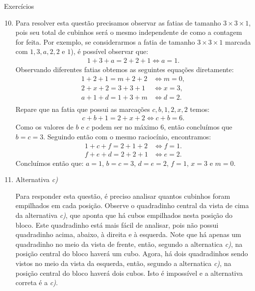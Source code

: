 \begin{answer}{Exercícios}
{\exerciselist
\begin{enumerate}\setcounter{enumi}{9}
\item Para resolver esta questão precisamos observar as fatias de tamanho \(3 \times 3 \times 1\), pois seu total de cubinhos será o mesmo independente de como a contagem for feita. Por exemplo, se considerarmos a fatia de tamanho \(3 \times 3 \times 1\) marcada com \(1, 3, a, 2, 2\) e \(1\)), é possível observar que:
\begin{equation*}
\begin{split}1+3+a=2+2+1 \Longleftrightarrow a = 1.\end{split}
\end{equation*}
Observando diferentes fatias obtemos as seguintes equações diretamente:
\begin{align*}
1+2+1=m+2+2 &\Longleftrightarrow m=0,\\
2+x+2=3+3+1 &\Longleftrightarrow x=3,\\
a+1+d=1+3+m &\Longleftrightarrow d=2.\\
\end{align*}
Repare que na fatia que possui as marcações \(c, b, 1, 2, x, 2\) temos:
\begin{equation*}
\begin{split}c+b+1=2+x+2 \Longleftrightarrow c+b=6.\end{split}
\end{equation*}
Como os valores de \(b\) e \(c\) podem ser no máximo 6, então concluímos que \(b=c=3\). Seguindo então com o mesmo raciocínio, encontramos:
\begin{align*}
1+c+f=2+1+2 &\Longleftrightarrow f = 1.\\
f+e+d=2+2+1 &\Longleftrightarrow e=2.
\end{align*}
Concluímos então que: \(a=1\), \(b=c=3\), \(d=e=2\), \(f=1\), \(x=3\) e \(m=0\).

\item Alternativa \textit{c)}

Para responder esta questão, é preciso analisar quantos cubinhos foram empilhados em cada posição. Observe o quadradinho central da vista de cima da alternativa \textit{c)}, que aponta que há cubos empilhados nesta posição do bloco. Este quadradinho está mais fácil de analisar, pois não possui quadradinho acima, abaixo, à direita e à esquerda. Note que há apenas um quadradinho no meio da vista de frente, então, segundo a alternatica \textit{c)}, na posição central do bloco haverá um cubo. Agora, há dois quadradinhos sendo vistos no meio da vista da esquerda, então, segundo a alternatica \textit{c)}, na posição central do bloco haverá dois cubos. Isto é impossível e a alternativa correta é a \textit{c)}.


\end{enumerate}}
\end{answer}
